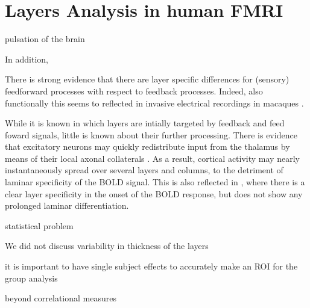 \section{Layers Analysis in human FMRI}


pulsation of the brain 

In addition, 



There is strong evidence that there are layer specific differences for (sensory) feedforward processes with respect to feedback processes. Indeed, also functionally this seems to reflected in invasive electrical recordings in macaques \cite{Buffalo2011,Maier2010,Maier2011,VanKerkoerle2017}.

While it is known in which layers are intially targeted by feedback and feed foward signals, little is known about their further processing. There is evidence that excitatory neurons may quickly redistribute input from the thalamus by means of their local axonal collaterals \cite{Guy2017,ReyesPuerta2015}. As a result, cortical activity may nearly instantaneously spread over several layers and columns, to the detriment of laminar specificity of the BOLD signal.
This is also reflected in \cite{Yu2015}, where there is a clear layer specificity in the onset of the BOLD response, but does not show any prolonged laminar differentiation. 



statistical problem



\cite{Maass2014}


We did not discuss variability in thickness of the layers

\cite{Heinzle}

\cite{Renzo}



it is important to have single subject effects to accurately make an ROI for the group analysis

beyond correlational measures
